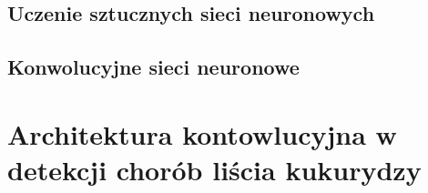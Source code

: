 \documentclass{article}
\begin{document}
\subsection{Uczenie sztucznych sieci neuronowych}

\subsection{Konwolucyjne sieci neuronowe}


\section{Architektura kontowlucyjna w detekcji chorób liścia kukurydzy}

\nocite{*}
 
\end{document}
